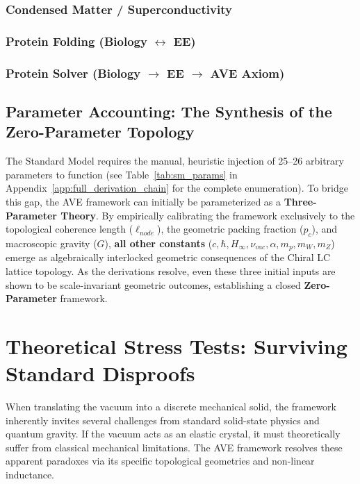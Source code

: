 \subsection{Condensed Matter / Superconductivity}


\subsection{Protein Folding (Biology $\leftrightarrow$ EE)}


\subsection{Protein Solver (Biology $\to$ EE $\to$ AVE Axiom)}


\section{Parameter Accounting: The Synthesis of the Zero-Parameter Topology}
The Standard Model requires the manual, heuristic injection of 25--26 arbitrary parameters to function (see Table~\ref{tab:sm_params} in Appendix~\ref{app:full_derivation_chain} for the complete enumeration). To bridge this gap, the AVE framework can initially be parameterized as a \textbf{Three-Parameter Theory}. By empirically calibrating the framework exclusively to the topological coherence length ($\ell_{node}$), the geometric packing fraction ($p_c$), and macroscopic gravity ($G$), \textbf{all other constants} ($c, \hbar, H_\infty, \nu_{vac}, \alpha, m_p, m_W, m_Z$) emerge as algebraically interlocked geometric consequences of the Chiral LC lattice topology. As the derivations resolve, even these three initial inputs are shown to be scale-invariant geometric outcomes, establishing a closed \textbf{Zero-Parameter} framework.

\chapter{Theoretical Stress Tests: Surviving Standard Disproofs}
\label{app:resolving_paradoxes}

When translating the vacuum into a discrete mechanical solid, the framework inherently invites several challenges from standard solid-state physics and quantum gravity. If the vacuum acts as an elastic crystal, it must theoretically suffer from classical mechanical limitations. The AVE framework resolves these apparent paradoxes via its specific topological geometries and non-linear inductance.

